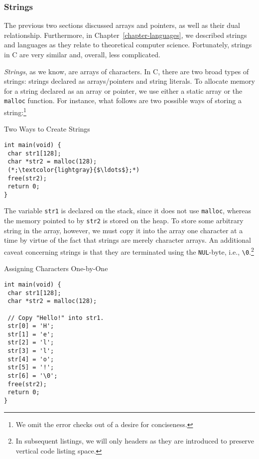 \subsubsection*{Strings}

The previous two sections discussed arrays and pointers, as well as their dual relationship. Furthermore, in Chapter~\ref{chapter-languages}, we described strings and languages as they relate to theoretical computer science. Fortunately, strings in C are very similar and, overall, less complicated.

\textit{Strings}, as we know, are arrays of characters. In C, there are two broad types of strings: strings declared as arrays/pointers and string literals. To allocate memory for a string declared as an array or pointer, we use either a static array or the \texttt{malloc} function. For instance, what follows are two possible ways of storing a string:\footnote{We omit the  error checks out of a desire for conciseness.}

\begin{cl}[main.c]{Two Ways to Create Strings}\begin{lstlisting}[language=MyC]
int main(void) {
 char str1[128];
 char *str2 = malloc(128);
 (*;\textcolor{lightgray}{$\ldots$};*)
 free(str2);
 return 0;
}
\end{lstlisting}\end{cl}

The variable \texttt{str1} is declared on the stack, since it does not use \texttt{malloc}, whereas the memory pointed to by \texttt{str2} is stored on the heap. To store some arbitrary string in the array, however, we must copy it into the array one character at a time by virtue of the fact that strings are merely character arrays. An additional caveat concerning strings is that they are terminated using the \texttt{NUL}-byte, i.e., \texttt{\textbackslash{0}}.\footnote{In subsequent listings, we will only  headers as they are introduced to preserve vertical code listing space.}

\begin{cl}[main.c]{Assigning Characters One-by-One}\begin{lstlisting}[language=MyC]
int main(void) {
 char str1[128];
 char *str2 = malloc(128);

 // Copy "Hello!" into str1.
 str[0] = 'H';
 str[1] = 'e';
 str[2] = 'l';
 str[3] = 'l';
 str[4] = 'o';
 str[5] = '!';
 str[6] = '\0';
 free(str2);
 return 0;
}
\end{lstlisting}\end{cl}

